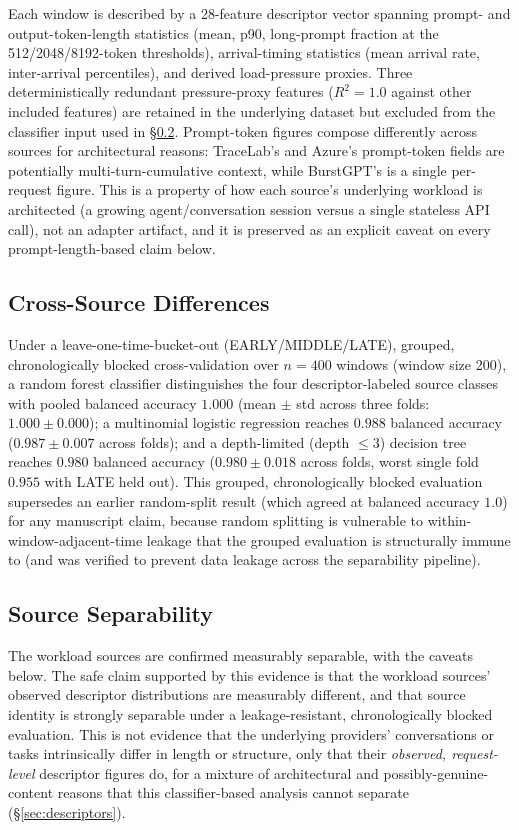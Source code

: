 \documentclass[sn-basic,Numbered,pdflatex]{sn-jnl}
\begin{document}
Each window is described by a 28-feature descriptor vector spanning prompt-
and output-token-length statistics (mean, p90, long-prompt fraction at the
512/2048/8192-token thresholds), arrival-timing statistics (mean arrival
rate, inter-arrival percentiles), and derived load-pressure proxies. Three
deterministically redundant pressure-proxy features ($R^2=1.0$ against
other included features) are retained in the underlying dataset but
excluded from the classifier input used in \S\ref{sec:separability}.
Prompt-token figures compose differently across sources for architectural
reasons: TraceLab's and Azure's prompt-token fields are potentially
multi-turn-cumulative context, while BurstGPT's is a single per-request
figure. This is a property of how each source's underlying workload is
architected (a growing agent/conversation session versus a single stateless
API call), not an adapter artifact, and it is preserved as an explicit
caveat on every prompt-length-based claim below.

\subsection{Cross-Source Differences}
\label{sec:cross-source-diffs}

Under a leave-one-time-bucket-out (EARLY/MIDDLE/LATE), grouped,
chronologically blocked cross-validation over $n=400$ windows (window
size 200), a random forest classifier distinguishes the four
descriptor-labeled source classes with pooled balanced accuracy
$1.000$ (mean $\pm$ std across three folds: $1.000 \pm 0.000$); a
multinomial logistic regression reaches $0.988$ balanced accuracy
($0.987 \pm 0.007$ across folds); and a depth-limited (depth $\le 3$)
decision tree reaches $0.980$ balanced accuracy ($0.980 \pm 0.018$ across
folds, worst single fold $0.955$ with LATE held out). This grouped,
chronologically blocked evaluation supersedes an earlier random-split
result (which agreed at balanced accuracy $1.0$) for any manuscript claim,
because random splitting is vulnerable to within-window-adjacent-time leakage that the grouped evaluation is structurally immune to (and was verified to prevent data leakage across the separability pipeline).

\subsection{Source Separability}
\label{sec:separability}

The workload sources are confirmed measurably separable, with the caveats
below. The safe claim
supported by this evidence is that the workload sources' observed
descriptor distributions are measurably different, and that source identity
is strongly separable under a leakage-resistant, chronologically blocked
evaluation. This is not evidence that the underlying providers'
conversations or tasks intrinsically differ in length or structure, only
that their \emph{observed, request-level} descriptor figures do, for a
mixture of architectural and possibly-genuine-content reasons that this
classifier-based analysis cannot separate (\S\ref{sec:descriptors}).
\end{document}
